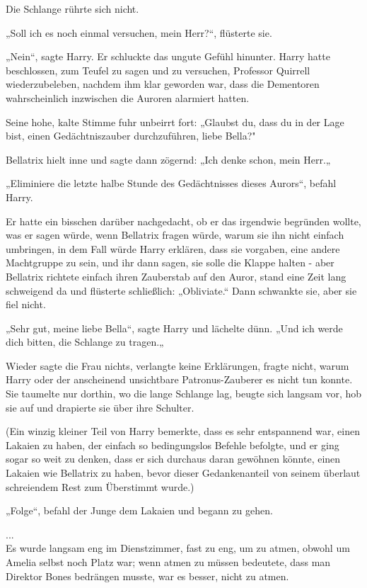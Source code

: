 {Die Schlange rührte sich nicht.

„Soll ich es noch einmal versuchen, mein Herr?“, flüsterte sie.

„Nein“, sagte Harry. Er schluckte das ungute Gefühl hinunter. Harry hatte beschlossen, zum Teufel zu sagen und zu versuchen, Professor Quirrell wiederzubeleben, nachdem ihm klar geworden war, dass die Dementoren wahrscheinlich inzwischen die Auroren alarmiert hatten.

Seine hohe, kalte Stimme fuhr unbeirrt fort: „Glaubst du, dass du in der Lage bist, einen Gedächtniszauber durchzuführen, liebe Bella?"

Bellatrix hielt inne und sagte dann zögernd: „Ich denke schon, mein Herr.„

„Eliminiere die letzte halbe Stunde des Gedächtnisses dieses Aurors“, befahl Harry.

Er hatte ein bisschen darüber nachgedacht, ob er das irgendwie begründen wollte, was er sagen würde, wenn Bellatrix fragen würde, warum sie ihn nicht einfach umbringen, in dem Fall würde Harry erklären, dass sie vorgaben, eine andere Machtgruppe zu sein, und ihr dann sagen, sie solle die Klappe halten - aber Bellatrix richtete einfach ihren Zauberstab auf den Auror, stand eine Zeit lang schweigend da und flüsterte schließlich: „Obliviate.“ Dann schwankte sie, aber sie fiel nicht.

„Sehr gut, meine liebe Bella“, sagte Harry und lächelte dünn. „Und ich werde dich bitten, die Schlange zu tragen.„

Wieder sagte die Frau nichts, verlangte keine Erklärungen, fragte nicht, warum Harry oder der anscheinend unsichtbare Patronus-Zauberer es nicht tun konnte. Sie taumelte nur dorthin, wo die lange Schlange lag, beugte sich langsam vor, hob sie auf und drapierte sie über ihre Schulter.

(Ein winzig kleiner Teil von Harry bemerkte, dass es sehr entspannend war, einen Lakaien zu haben, der einfach so bedingungslos Befehle befolgte, und er ging sogar so weit zu denken, dass er sich durchaus daran gewöhnen könnte, einen Lakaien wie Bellatrix zu haben, bevor dieser Gedankenanteil von seinem überlaut schreiendem Rest zum Überstimmt wurde.)

„Folge“, befahl der Junge dem Lakaien und begann zu gehen.

...\\ Es wurde langsam eng im Dienstzimmer, fast zu eng, um zu atmen, obwohl um Amelia selbst noch Platz war; wenn atmen zu müssen bedeutete, dass man Direktor Bones bedrängen musste, war es besser, nicht zu atmen.

}
